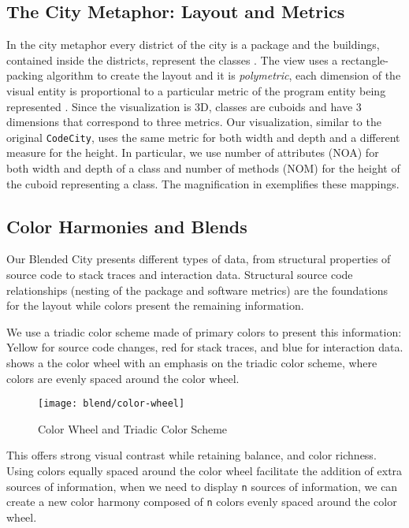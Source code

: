 \subsection{The City Metaphor: Layout and Metrics}

In the city metaphor every  district of the city is a package and the buildings, contained inside the districts, represent the classes \cite{Wett2007}. The view uses a rectangle-packing algorithm to create the layout and it is \emph{polymetric}, \ie each dimension of the visual entity is proportional to a particular metric of the program entity being represented \cite{Lanz2004}. Since the visualization is 3D, classes are cuboids and have 3 dimensions that correspond to three metrics. Our visualization, similar to the original \texttt{CodeCity}, uses the same metric for both width and depth and a different measure for the height. In particular, we use number of attributes (\ie NOA) for both width and depth of a class and number of methods (\ie NOM) for the height of the cuboid representing a class. The magnification in  exemplifies these mappings.

\subsection{Color Harmonies and Blends}

Our Blended City presents different types of data, from structural properties of source code to stack traces and interaction data. Structural source code relationships (\ie nesting of the package and software metrics) are the foundations for the layout while colors present the remaining information. 

We use a triadic color scheme made of primary colors to present this information: Yellow for source code changes, red for stack traces, and blue for interaction data.  shows a the color wheel with an emphasis on the triadic color scheme, where colors are evenly spaced around the color wheel. 

\begin{figure}[ht]
\centering
\texttt{[image: blend/color-wheel]}
\caption{Color Wheel and Triadic Color Scheme}
\label{fig:color-wheel}
\end{figure}

This offers strong visual contrast while retaining balance, and color richness. Using colors equally spaced around the color wheel facilitate the addition of extra sources of information, \ie when we need to display \texttt{n} sources of information, we can create a new color harmony composed of \texttt{n} colors evenly spaced around the color wheel.

